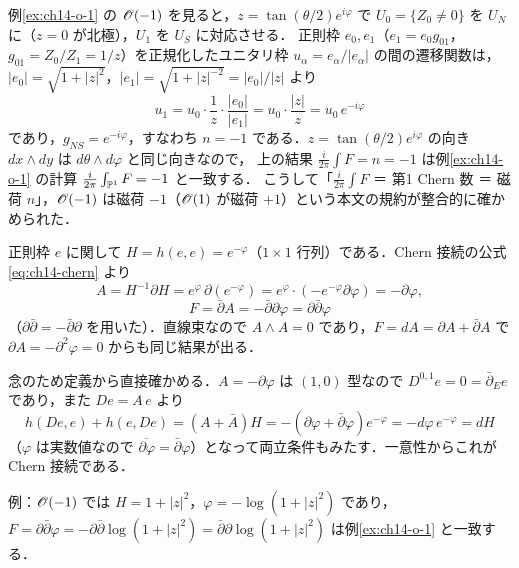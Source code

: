 例\ref{ex:ch14-o-1} の $\mathscr{O}(-1)$ を見ると，$z=\tan(\theta/2)e^{i\varphi}$ で $U_0=\{Z_0\neq0\}$ を $U_N$ に（$z=0$ が北極），$U_1$ を $U_S$ に対応させる．
正則枠 $e_0,e_1$（$e_1=e_0g_{01}$，$g_{01}=Z_0/Z_1=1/z$）を正規化したユニタリ枠 $u_\alpha=e_\alpha/|e_\alpha|$ の間の遷移関数は，$|e_0|=\sqrt{1+|z|^2}$，$|e_1|=\sqrt{1+|z|^{-2}}=|e_0|/|z|$ より
\begin{equation*}
  u_1 = u_0\cdot\frac{1}{z}\cdot\frac{|e_0|}{|e_1|} = u_0\cdot\frac{|z|}{z} = u_0\,e^{-i\varphi}
\end{equation*}
であり，$g_{NS}=e^{-i\varphi}$，すなわち $n=-1$ である．$z=\tan(\theta/2)e^{i\varphi}$ の向き $dx\wedge dy$ は $d\theta\wedge d\varphi$ と同じ向きなので，
上の結果 $\frac{i}{2\pi}\int F=n=-1$ は例\ref{ex:ch14-o-1} の計算 $\frac{i}{2\pi}\int_{\mathbb{P}^1}F=-1$ と一致する．
こうして「$\frac{i}{2\pi}\int F$ ＝ 第1 Chern 数 ＝ 磁荷 $n$」，$\mathscr{O}(-1)$ は磁荷 $-1$（$\mathscr{O}(1)$ が磁荷 $+1$）という本文の規約が整合的に確かめられた．

正則枠 $e$ に関して $H=h(e,e)=e^{-\varphi}$（$1\times1$ 行列）である．Chern 接続の公式 \eqref{eq:ch14-chern} より
\begin{equation*}
  A = H^{-1}\partial H = e^{\varphi}\,\partial(e^{-\varphi}) = e^{\varphi}\cdot(-e^{-\varphi}\partial\varphi) = -\partial\varphi,
\end{equation*}
\begin{equation*}
  F = \bar\partial A = -\bar\partial\partial\varphi = \partial\bar\partial\varphi
\end{equation*}
（$\partial\bar\partial=-\bar\partial\partial$ を用いた）．直線束なので $A\wedge A=0$ であり，$F=dA=\partial A+\bar\partial A$ で $\partial A=-\partial^2\varphi=0$ からも同じ結果が出る．

念のため定義から直接確かめる．$A=-\partial\varphi$ は $(1,0)$ 型なので $D^{0,1}e=0=\bar\partial_Ee$ であり，また $D e = A\,e$ より
\begin{equation*}
  h(De,e)+h(e,De) = (A+\bar A)H = -(\partial\varphi+\bar\partial\varphi)e^{-\varphi} = -d\varphi\,e^{-\varphi} = dH
\end{equation*}
（$\varphi$ は実数値なので $\overline{\partial\varphi}=\bar\partial\varphi$）となって両立条件もみたす．一意性からこれが Chern 接続である．

例：$\mathscr{O}(-1)$ では $H=1+|z|^2$，$\varphi=-\log(1+|z|^2)$ であり，$F=\partial\bar\partial\varphi=-\partial\bar\partial\log(1+|z|^2)=\bar\partial\partial\log(1+|z|^2)$ は例\ref{ex:ch14-o-1} と一致する．

